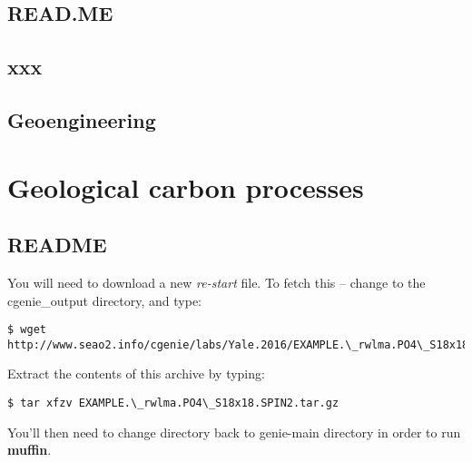 \documentclass[11pt,fleqn]{book} %
\begin{document}
\newpage


\section*{READ.ME}



\newpage


\section{xxx}



\newpage


\section{Geoengineering}


\cleardoublepage


\chapter{Geological carbon processes}

\hfill \break


\newpage


\section*{README}

You will need to download a new \textit{re-start} file. To fetch this -- change to the \textsf{\footnotesize cgenie\_output directory}, and type:
\vspace{-1mm}\small\begin{verbatim}
$ wget http://www.seao2.info/cgenie/labs/Yale.2016/EXAMPLE.\_rwlma.PO4\_S18x18.SPIN2.tar.gz
\end{verbatim}\normalsize\vspace{-1mm}
\noindent Extract the contents of this archive by typing:
\vspace{-1mm}\small\begin{verbatim}
$ tar xfzv EXAMPLE.\_rwlma.PO4\_S18x18.SPIN2.tar.gz
\end{verbatim}\normalsize\vspace{-1mm}
You’ll then need to change directory back to \textsf{\footnotesize genie-main } directory in order to run \textbf{muffin}.
\end{document}
